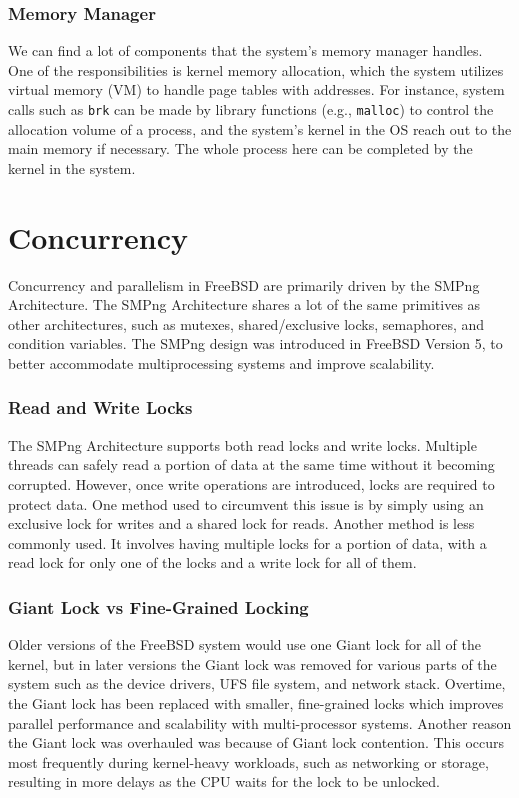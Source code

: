 \documentclass[12pt, dvipsnames, a4paper]{article}
\newcommand{\code}[1]{\texttt{#1}}
\begin{document}
\subsubsection{Memory Manager}
We can find a lot of components that the system’s memory manager handles. One of the responsibilities is kernel memory allocation, which the system utilizes virtual memory (VM) to handle page tables with addresses. For instance, system calls such as \code{brk} can be made by library functions (e.g., \code{malloc}) to control the allocation volume of a process, and the system’s kernel in the OS reach out to the main memory if necessary. The whole process here can be completed by the kernel in the system.\par

\section{Concurrency}
Concurrency and parallelism in FreeBSD are primarily driven by the SMPng Architecture. The SMPng Architecture shares a lot of the same primitives as other architectures, such as mutexes, shared/exclusive locks, semaphores, and condition variables. The SMPng design was introduced in FreeBSD Version 5, to better accommodate multiprocessing systems and improve scalability.

\subsubsection{Read and Write Locks}

The SMPng Architecture supports both read locks and write locks. Multiple threads can safely read a portion of data at the same time without it becoming corrupted. However, once write operations are introduced, locks are required to protect data. One method used to circumvent this issue is by simply using an exclusive lock for writes and a shared lock for reads. Another method is less commonly used. It involves having multiple locks for a portion of data, with a read lock for only one of the locks and a write lock for all of them.

\subsubsection{Giant Lock vs Fine-Grained Locking}

Older versions of the FreeBSD system would use one Giant lock for all of the kernel, but in later versions the Giant lock was removed for various parts of the system such as the device drivers, UFS file system, and network stack. Overtime, the Giant lock has been replaced with smaller, fine-grained locks which improves parallel performance and scalability with multi-processor systems. Another reason the Giant lock was overhauled was because of Giant lock contention. This occurs most frequently during kernel-heavy workloads, such as networking or storage, resulting in more delays as the CPU waits for the lock to be unlocked.
\end{document}
